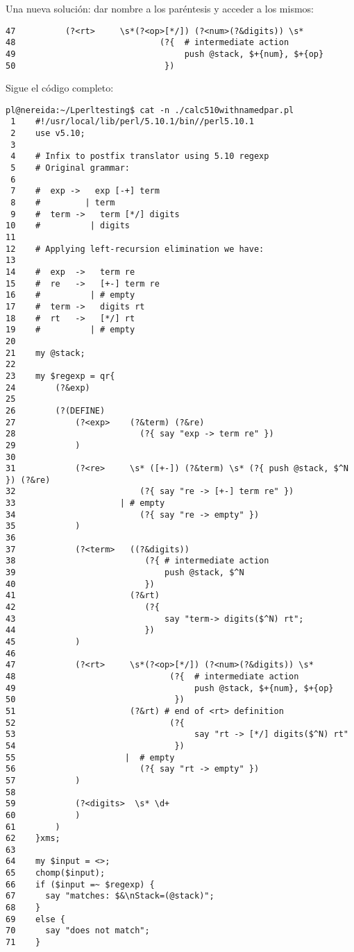 Una nueva solución: dar nombre a los paréntesis y acceder a los mismos:
\begin{verbatim}
47          (?<rt>     \s*(?<op>[*/]) (?<num>(?&digits)) \s*
48                             (?{  # intermediate action
49                                  push @stack, $+{num}, $+{op}
50                              })
\end{verbatim}

Sigue el código completo:

\begin{latexonly}
\begin{verbatim}
pl@nereida:~/Lperltesting$ cat -n ./calc510withnamedpar.pl
 1    #!/usr/local/lib/perl/5.10.1/bin//perl5.10.1
 2    use v5.10;
 3  
 4    # Infix to postfix translator using 5.10 regexp
 5    # Original grammar:
 6  
 7    #  exp ->   exp [-+] term
 8    #         | term
 9    #  term ->   term [*/] digits
10    #          | digits
11  
12    # Applying left-recursion elimination we have:
13  
14    #  exp  ->   term re
15    #  re   ->   [+-] term re
16    #          | # empty
17    #  term ->   digits rt
18    #  rt   ->   [*/] rt
19    #          | # empty
20  
21    my @stack;
22  
23    my $regexp = qr{
24        (?&exp)
25  
26        (?(DEFINE)
27            (?<exp>    (?&term) (?&re)
28                         (?{ say "exp -> term re" })
29            )
30  
31            (?<re>     \s* ([+-]) (?&term) \s* (?{ push @stack, $^N }) (?&re)
32                         (?{ say "re -> [+-] term re" })
33                     | # empty
34                         (?{ say "re -> empty" })
35            )
36  
37            (?<term>   ((?&digits))
38                          (?{ # intermediate action
39                              push @stack, $^N
40                          })
41                       (?&rt)
42                          (?{
43                              say "term-> digits($^N) rt";
44                          })
45            )
46  
47            (?<rt>     \s*(?<op>[*/]) (?<num>(?&digits)) \s*
48                               (?{  # intermediate action
49                                    push @stack, $+{num}, $+{op}
50                                })
51                       (?&rt) # end of <rt> definition
52                               (?{
53                                    say "rt -> [*/] digits($^N) rt"
54                                })
55                      |  # empty
56                         (?{ say "rt -> empty" })
57            )
58  
59            (?<digits>  \s* \d+
60            )
61        )
62    }xms;
63  
64    my $input = <>;
65    chomp($input);
66    if ($input =~ $regexp) {
67      say "matches: $&\nStack=(@stack)";
68    }
69    else {
70      say "does not match";
71    }
\end{verbatim}
\end{latexonly}
